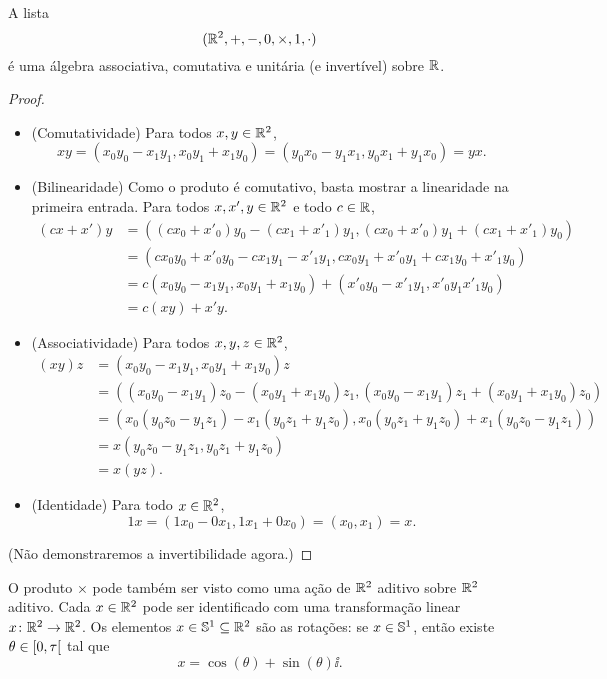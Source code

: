 \begin{proposition}
A lista
	\begin{equation*}
	(\R^2,+,-,0,\times,1,\cdot)
	\end{equation*}
é uma álgebra associativa, comutativa e unitária (e invertível) sobre $\R$.
\end{proposition}
\begin{proof}
\begin{itemize}
	\item (Comutatividade) Para todos $x,y \in \R^2$,
		\begin{equation*}
		xy = (x_0y_0-x_1y_1,x_0y_1+x_1y_0) = (y_0x_0-y_1x_1,y_0x_1+y_1x_0) = yx.
		\end{equation*}
	\item (Bilinearidade) Como o produto é comutativo, basta mostrar a linearidade na primeira entrada. Para todos $x,x',y \in \R^2$ e todo $c \in \R$,
		\begin{align*}
		(cx+x')y &= ((cx_0+x'_0)y_0-(cx_1+x'_1)y_1,(cx_0+x'_0)y_1+(cx_1+x'_1)y_0) \\
			&= (cx_0y_0+x'_0y_0-cx_1y_1-x'_1y_1,cx_0y_1+x'_0y_1+cx_1y_0+x'_1y_0) \\
			&= c(x_0y_0-x_1y_1,x_0y_1+x_1y_0) + (x'_0y_0-x'_1y_1,x'_0y_1x'_1y_0) \\
			&= c(xy) + x'y.
		\end{align*}
	\item (Associatividade) Para todos $x,y,z \in \R^2$,
	\begin{align*}
	(xy)z &= (x_0y_0-x_1y_1,x_0y_1+x_1y_0)z \\
		&= ((x_0y_0-x_1y_1)z_0 - (x_0y_1+x_1y_0)z_1 , (x_0y_0-x_1y_1)z_1 + (x_0y_1+x_1y_0)z_0 ) \\
		&= (x_0(y_0z_0-y_1z_1)-x_1(y_0z_1+y_1z_0),x_0(y_0z_1+y_1z_0)+x_1(y_0z_0-y_1z_1)) \\
		&= x(y_0z_0-y_1z_1,y_0z_1+y_1z_0) \\
		&= x(yz).
	\end{align*}
	\item (Identidade) Para todo $x \in \R^2$,
	\begin{equation*}
	1x = (1x_0-0x_1,1x_1+0x_0) = (x_0,x_1) = x.
	\end{equation*}
\end{itemize}
(Não demonstraremos a invertibilidade agora.)
\end{proof}


O produto $\times$ pode também ser visto como uma ação de $\R^2$ aditivo sobre $\R^2$ aditivo. Cada $x \in \R^2$ pode ser identificado com uma transformação linear $x\colon \R^2 \to \R^2$. Os elementos $x \in \S^1 \subseteq \R^2$ são as rotações: se $x \in \S^1$, então existe $\theta \in \intfa{0}{\tau}$ tal que
	\begin{equation*}
	x = \cos(\theta) + \sin(\theta) \ii.
	\end{equation*}

